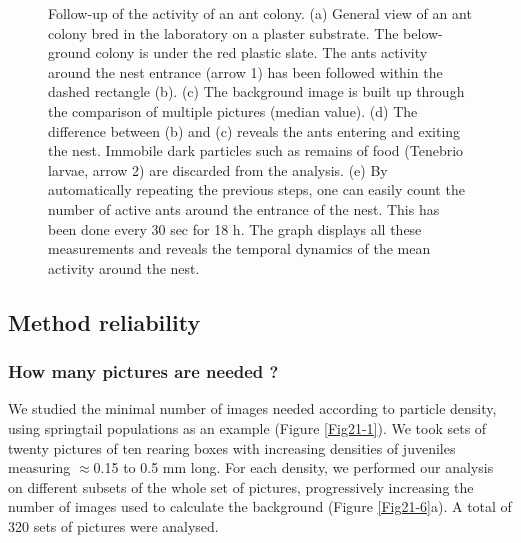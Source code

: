 \begin{figure}[!h]
\caption[ Follow-up of the activity of an ant colony]{ Follow-up of the activity of an ant colony. (a) General view of an ant colony
bred in the laboratory on a plaster substrate. The below-ground colony is under
the red plastic slate. The ants activity around the nest entrance (arrow 1) has
been followed within the dashed rectangle (b). (c) The background image is built
up through the comparison of multiple pictures (median value). (d) The
difference between (b) and (c) reveals the ants entering and exiting the nest.
Immobile dark particles such as remains of food (Tenebrio larvae, arrow 2) are
discarded from the analysis. (e) By automatically repeating the previous steps,
one can easily count the number of active ants around the entrance of the nest.
This has been done every 30 sec for 18 h. The graph displays all these
measurements and reveals the temporal dynamics of the mean activity around the
nest.
}
\label{Fig21-5}
\end{figure}


\subsection{Method reliability}

\subsubsection{How many pictures are needed ?}

We studied the minimal number of images needed according to particle density,
using springtail populations as an example (Figure \ref{Fig21-1}). We took sets of twenty
pictures of ten rearing boxes with increasing densities of juveniles measuring
$\approx$0.15 to 0.5 mm long. For each density, we performed our analysis on different
subsets of the whole set of pictures, progressively increasing the number of
images used to calculate the background (Figure \ref{Fig21-6}a). A total of 320 sets of
pictures were analysed.

